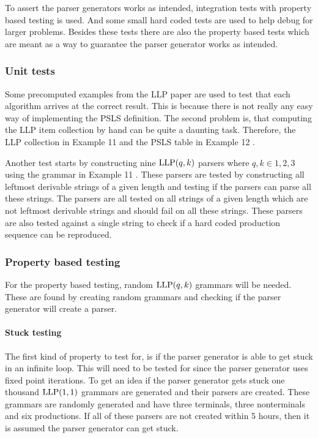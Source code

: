To assert the parser generators works as intended, integration tests with property based testing is used. And some small hard coded tests are used to help debug for larger problems. Besides these tests there are also the property based tests which are meant as a way to guarantee the parser generator works as intended.

\subsubsection{Unit tests}
Some precomputed examples from the LLP paper \cite{Vagner2007} are used to test that each algorithm arrives at the correct result. This is because there is not really any easy way of implementing the PSLS definition. The second problem is, that computing the LLP item collection by hand can be quite a daunting task. Therefore, the LLP collection in Example 11 \cite[14]{Vagner2007} and the PSLS table in Example 12 \cite[14]{Vagner2007}.

Another test starts by constructing nine $\text{LLP}(q, k)$ parsers where $q, k \in {1, 2, 3}$ using the grammar in Example 11 \cite[14]{Vagner2007}. These parsers are tested by constructing all leftmost derivable strings of a given length and testing if the parsers can parse all these strings. The parsers are all tested on all strings of a given length which are not leftmost derivable strings and should fail on all these strings. These parsers are also tested against a single string to check if a hard coded production sequence can be reproduced.

\subsubsection{Property based testing}
For the property based testing, random $\text{LLP}(q,k)$ grammars will be needed. These are found by creating random grammars and checking if the parser generator will create a parser.

\paragraph{Stuck testing}
The first kind of property to test for, is if the parser generator is able to get stuck in an infinite loop. This will need to be tested for since the parser generator uses fixed point iterations. To get an idea if the parser generator gets stuck one thousand $\text{LLP}(1, 1)$ grammars are generated and their parsers are created. These grammars are randomly generated and have three terminals, three nonterminals and six productions. If all of these parsers are not created within 5 hours, then it is assumed the parser generator can get stuck.

